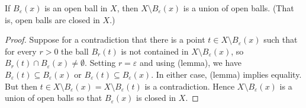 \begin{lemma}
If \( B_{\varepsilon } (x) \) is an open ball in \( X \), then \( X \setminus  B_{\varepsilon } (x) \) is a union of open balls. (That is, open balls are closed in \( X \).)
\end{lemma}
\begin{proof}
Suppose for a contradiction that there is a point \( t \in X \setminus B_{\varepsilon} (x) \) such that for every \( r > 0 \) the ball \( B_{r}(t) \) is not contained in \( X \setminus B_{\varepsilon } (x) \), so \( B_{r} (t) \cap B_{\varepsilon} (x) \neq \emptyset \). Setting \( r = \varepsilon  \) and using (lemma), we have \( B_{\varepsilon} (t) \subseteq B_{\varepsilon } (x) \) or \( B_{\varepsilon} (t) \subseteq B_{\varepsilon} (x) \). In either case, (lemma) implies equality. But then \( t \in X \setminus B_{\varepsilon } (x) = X \setminus B_{\varepsilon } (t) \) is a contradiction. Hence \( X \setminus B_{\varepsilon } (x) \) is a union of open balls so that \( B_{\varepsilon } (x) \) is closed in \( X \).
\end{proof}



